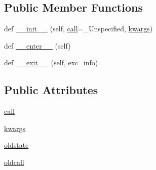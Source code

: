\subsection*{Public Member Functions}
\begin{DoxyCompactItemize}
\item 
def \hyperlink{classnumpy_1_1core_1_1__ufunc__config_1_1errstate_a34addaf353e08a4f0487e9bf765aed4d}{\+\_\+\+\_\+init\+\_\+\+\_\+} (self, \hyperlink{classnumpy_1_1core_1_1__ufunc__config_1_1errstate_a564df480ec82105a3125ffdf14b6d097}{call}=\+\_\+\+Unspecified, \hyperlink{classnumpy_1_1core_1_1__ufunc__config_1_1errstate_aff9c5210e68de0197118513e15ba4c39}{kwargs})
\item 
def \hyperlink{classnumpy_1_1core_1_1__ufunc__config_1_1errstate_aa8efcbcc1c314dd3a673f15cbf97ab83}{\+\_\+\+\_\+enter\+\_\+\+\_\+} (self)
\item 
def \hyperlink{classnumpy_1_1core_1_1__ufunc__config_1_1errstate_a4d864080f4c91a2e62c714f9e935a4cf}{\+\_\+\+\_\+exit\+\_\+\+\_\+} (self, exc\+\_\+info)
\end{DoxyCompactItemize}
\subsection*{Public Attributes}
\begin{DoxyCompactItemize}
\item 
\hyperlink{classnumpy_1_1core_1_1__ufunc__config_1_1errstate_a564df480ec82105a3125ffdf14b6d097}{call}
\item 
\hyperlink{classnumpy_1_1core_1_1__ufunc__config_1_1errstate_aff9c5210e68de0197118513e15ba4c39}{kwargs}
\item 
\hyperlink{classnumpy_1_1core_1_1__ufunc__config_1_1errstate_a08d963ccd4828cb523bb6b81b0c1a03d}{oldstate}
\item 
\hyperlink{classnumpy_1_1core_1_1__ufunc__config_1_1errstate_a53a63797f94904edca2dcc34ea4c9aa7}{oldcall}
\end{DoxyCompactItemize}


